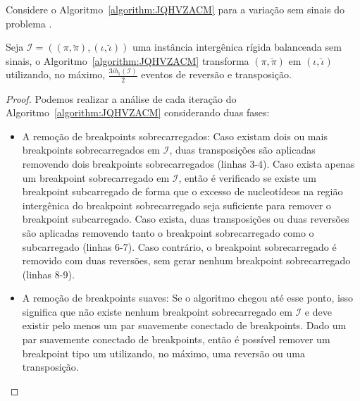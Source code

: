 Considere o Algoritmo~\ref{algorithm:JQHVZACM} para a variação sem sinais do problema \SbIRT{}.



\begin{lemma}\label{lemma:RNJHXOWZ}
Seja $\mathcal{I} = ((\pi,\breve\pi),(\iota,\breve\iota))$ uma instância intergênica rígida balanceada sem sinais, o Algoritmo~\ref{algorithm:JQHVZACM} transforma $(\pi,\breve\pi)$ em $(\iota,\breve\iota)$ utilizando, no máximo, $\frac{3ib_1(\mathcal{I})}{2}$ eventos de reversão e transposição.
\end{lemma}
\begin{proof}
Podemos realizar a análise de cada iteração do Algoritmo~\ref{algorithm:JQHVZACM} considerando duas fases:
\begin{itemize}
  \item A remoção de breakpoints sobrecarregados: Caso existam dois ou mais breakpoints sobrecarregados em $\mathcal{I}$, duas transposições são aplicadas removendo dois breakpoints sobrecarregados (linhas 3-4). Caso exista apenas um breakpoint sobrecarregado em $\mathcal{I}$, então é verificado se existe um breakpoint subcarregado de forma que o excesso de nucleotídeos na região intergênica do breakpoint sobrecarregado seja suficiente para remover o breakpoint subcarregado. Caso exista, duas transposições ou duas reversões são aplicadas removendo tanto o breakpoint sobrecarregado como o subcarregado (linhas 6-7). Caso contrário, o breakpoint sobrecarregado é removido com duas reversões, sem gerar nenhum breakpoint sobrecarregado (linhas 8-9).
  \item A remoção de breakpoints suaves: Se o algoritmo chegou até esse ponto, isso significa que não existe nenhum breakpoint sobrecarregado em $\mathcal{I}$ e deve existir pelo menos um par suavemente conectado de breakpoints. Dado um par suavemente conectado de breakpoints, então é possível remover um breakpoint tipo um utilizando, no máximo, uma reversão ou uma transposição.
\end{itemize}

\end{proof}
